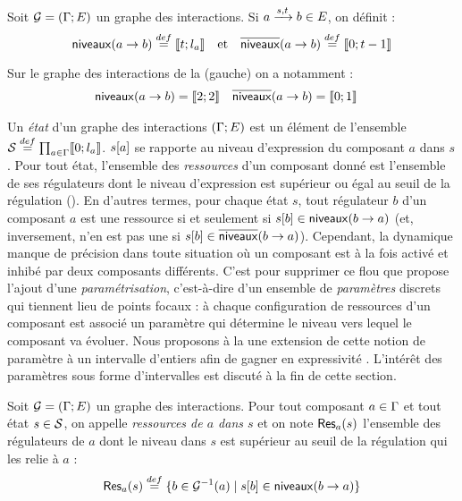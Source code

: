 \begin{definition}
  Soit $\mathcal{G} = (\mathrm{\Gamma}; E)$ un graphe des interactions.
  Si $a \xrightarrow{s, t} b \in E$, on définit :
    \[\mathsf{niveaux}(a\rightarrow b) \stackrel{def}= \mathopen{\llbracket}t\mathclose{};l_a\mathclose{\rrbracket} \quad \text{et} \quad
      \overline{\mathsf{niveaux}}(a\rightarrow b) \stackrel{def}= \mathopen{\llbracket}0\mathclose{};t-1\mathclose{\rrbracket}\]
\end{definition}

\begin{example}
  Sur le graphe des interactions de la (gauche)
  on a notamment :
  \begin{align*}
    \mathsf{niveaux}(a\rightarrow b) &= \mathopen{\llbracket}2\mathclose{};2\mathclose{\rrbracket} & \overline{\mathsf{niveaux}}(a\rightarrow b) &= \mathopen{\llbracket}0\mathclose{};1\mathclose{\rrbracket}
  \end{align*}
\end{example}

\myskip

Un \emph{état} d'un graphe des interactions $(\mathrm{\Gamma}; E)$ est un élément de l'ensemble
$\mathcal{S} \stackrel{def}= \prod_{a \in \mathrm{\Gamma}} \mathopen{\llbracket}0\mathclose{};l_a\mathclose{\rrbracket}$.
${s[a]}$ se rapporte au niveau d'expression du composant $a$ dans $s$.
Pour tout état, l'ensemble des \emph{ressources} d'un composant donné est
l'ensemble de ses régulateurs dont le niveau d'expression est supérieur ou égal au seuil
de la régulation ().
En d'autres termes, pour chaque état $s$, tout régulateur $b$ d'un composant $a$
est une ressource si et seulement si ${s[b]} \in \mathsf{niveaux}(b\rightarrow a)$
(et, inversement, n'en est pas une si ${s[b]} \in \overline{\mathsf{niveaux}}(b\rightarrow a)$).
Cependant, la dynamique manque de précision dans toute situation où un
composant est à la fois activé et inhibé par deux composants différents.
C'est pour supprimer ce flou que  propose l'ajout d'une
\emph{paramétrisation},
c'est-à-dire d'un ensemble de \emph{paramètres} discrets
qui tiennent lieu de points focaux :
à chaque configuration de ressources d'un composant est associé un paramètre
qui détermine le niveau vers lequel le composant va évoluer.
Nous proposons à la  une extension de cette notion de paramètre
à un intervalle d'entiers afin de gagner en expressivité
\cite{FPIMR12-CMSB}.
L'intérêt des paramètres sous forme d'intervalles est discuté à la fin de cette section.

\begin{definition}
  Soit $\mathcal{G} = (\mathrm{\Gamma}; E)$ un graphe des interactions.
  Pour tout composant $a \in \mathrm{\Gamma}$ et tout état $s \in \mathcal{S}$,
  on appelle \emph{ressources de $a$ dans $s$} et on note $\mathsf{Res}_{a}(s)$
  l'ensemble des régulateurs de $a$ dont le niveau dans $s$ est supérieur au seuil
  de la régulation qui les relie à $a$ :
    \[\mathsf{Res}_{a}(s) \stackrel{def}= \{ b \in \mathcal{G}^{-1}(a) \mid {s[b]} \in \mathsf{niveaux}(b\rightarrow a) \}\]
\end{definition}

